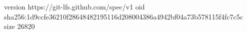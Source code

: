 version https://git-lfs.github.com/spec/v1
oid sha256:1d9ccfe36210f28648482195116d208004386a4942bf04a73b578115f4fc7c5c
size 26820
